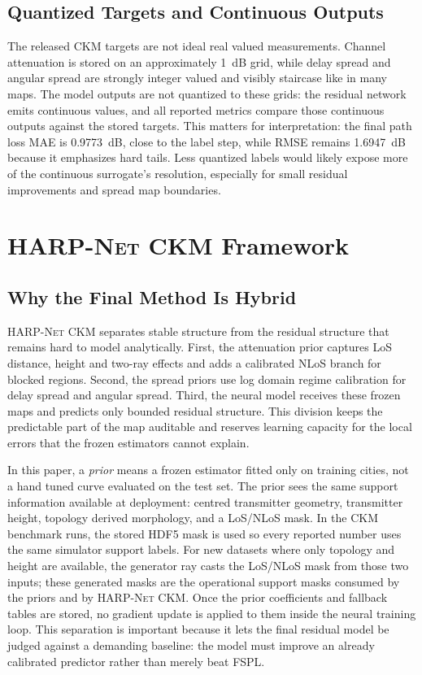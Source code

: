 \documentclass[journal]{IEEEtran}
\begin{document}
\subsection{Quantized Targets and Continuous Outputs}

The released CKM targets are not ideal real valued measurements. Channel attenuation is
stored on an approximately \SI{1}{dB} grid, while delay spread and angular
spread are strongly integer valued and visibly staircase like in many maps. The
model outputs are not quantized to these grids: the residual network emits
continuous values, and all reported metrics compare those continuous outputs
against the stored targets. This matters for interpretation: the final path
loss MAE is \SI{0.9773}{dB}, close to the label step, while RMSE remains
\SI{1.6947}{dB} because it emphasizes hard tails. Less quantized labels would
likely expose more of the continuous surrogate's resolution, especially for
small residual improvements and spread map boundaries.

\section{\textsc{HARP-Net CKM} Framework}

\subsection{Why the Final Method Is Hybrid}

\textsc{HARP-Net CKM} separates stable structure from the residual structure
that remains hard to model analytically. First, the attenuation prior captures
LoS distance, height and two-ray effects and adds a calibrated NLoS branch for
blocked regions. Second, the spread priors use log domain regime calibration
for delay spread and angular spread. Third, the neural model receives these
frozen maps and predicts only bounded residual structure. This division keeps
the predictable part of the map auditable and reserves learning capacity for
the local errors that the frozen estimators cannot explain.

In this paper, a \emph{prior} means a frozen estimator fitted only on training
cities, not a hand tuned curve evaluated on the test set. The prior sees the
same support information available at deployment: centred transmitter geometry,
transmitter height, topology derived morphology, and a LoS/NLoS mask. In the
CKM benchmark runs, the stored HDF5 mask is used so every reported number uses
the same simulator support labels. For new datasets where only topology and
height are available, the generator ray casts the LoS/NLoS mask from those two
inputs; these generated masks are the operational support masks consumed by the
priors and by \textsc{HARP-Net CKM}. Once the prior coefficients and fallback
tables are stored, no gradient update is applied to them inside the neural
training loop. This separation is important because it lets the final residual
model be judged against a demanding baseline: the model must improve an already
calibrated predictor rather than merely beat FSPL.
\end{document}
